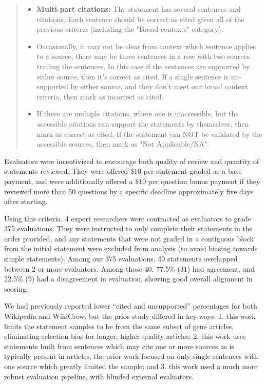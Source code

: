 \documentclass{article}
\begin{document}
\begin{quote}
\begin{itemize}
\item{\textbf{Multi-part citations:} The statement has several sentences and citations. Each sentence should be correct as cited given all of the previous criteria (including the "Broad contexts" category).}

\item{Occasionally, it may not be clear from context which sentence applies to a source, there may be three sentences in a row with two sources trailing the sentences. In this case if the sentences are supported by either source, then it's correct as cited. If a single sentence is un-supported by either source, and they don't meet our broad context criteria, then mark as incorrect as cited.}

\item{If there are multiple citations, where one is inaccessible, but the accessible citations can support the statements by themselves, then mark as correct as cited. If the statement can NOT be validated by the accessible sources, then mark as "Not Applicable/NA".}
\end{itemize}
\end{quote}

Evaluators were incentivized to encourage both quality of review and quantity of statements reviewed. They were offered \$10 per statement graded as a base payment, and were additionally offered a \$10 per question bonus payment if they reviewed more than 50 questions by a specific deadline approximately five days after starting.

Using this criteria, 4 expert researchers were contracted as evaluators to grade 375 evaluations. They were instructed to only complete their statements in the order provided, and any statements that were not graded in a contiguous block from the initial statement were excluded from analysis (to avoid biasing towards simple statements). Among our 375 evaluations, 40 statements overlapped between 2 or more evaluators. Among those 40, 77.5\% (31) had agreement, and 22.5\% (9) had a disagreement in evaluation, showing good overall alignment in scoring. 

We had previously reported\cite{coxWikiCrow} lower ``cited and unsupported'' percentages for both Wikipedia and WikiCrow, but the prior study differed in key ways: 1. this work limits the statement samples to be from the same subset of gene articles, eliminating selection bias for longer, higher quality articles; 2. this work uses statements built from sentences which may cite one or more sources as is typically present in articles, the prior work focused on only single sentences with one source which greatly limited the sample; and 3. this work used a much more robust evaluation pipeline, with blinded external evaluators.
\end{document}
